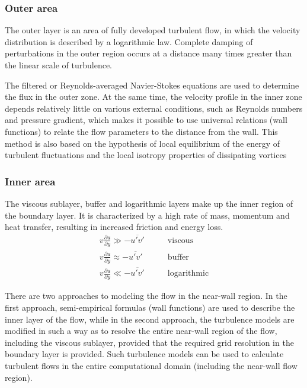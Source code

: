 \subsubsection{Outer area}
	The outer layer is an area of fully developed turbulent flow, in which the velocity distribution is described by a logarithmic law. Complete damping of perturbations in the outer region occurs at a distance many times greater than the linear scale of turbulence.
	
	The filtered or Reynolds-averaged Navier-Stokes equations are used to determine the flux in the outer zone. At the same time, the velocity profile in the inner zone depends relatively little on various external conditions, such as Reynolds numbers and pressure gradient, which makes it possible to use universal relations (wall functions) to relate the flow parameters to the distance from the wall. This method is also based on the hypothesis of local equilibrium of the energy of turbulent fluctuations and the local isotropy properties of dissipating vortices

\subsubsection{Inner area}
	The viscous sublayer, buffer and logarithmic layers make up the inner region of the boundary layer. It is characterized by a high rate of mass, momentum and heat transfer, resulting in increased friction and energy loss.
	\begin{align}
		v\frac{\partial u}{\partial y} \gg -\overline{u'v'} & \qquad\text{viscous}\nonumber \\
		v\frac{\partial u}{\partial y} \approx -\overline{u'v'} & \qquad\text{buffer}\nonumber \\
		v\frac{\partial u}{\partial y} \ll -\overline{u'v'} & \qquad\text{logarithmic}
	\end{align}

	There are two approaches to modeling the flow in the near-wall region. In the first approach, semi-empirical formulas (wall functions) are used to describe the inner layer of the flow, while in the second approach, the turbulence models are modified in such a way as to resolve the entire near-wall region of the flow, including the viscous sublayer, provided that the required grid resolution in the boundary layer is provided. Such turbulence models can be used to calculate turbulent flows in the entire computational domain (including the near-wall flow region).
	
